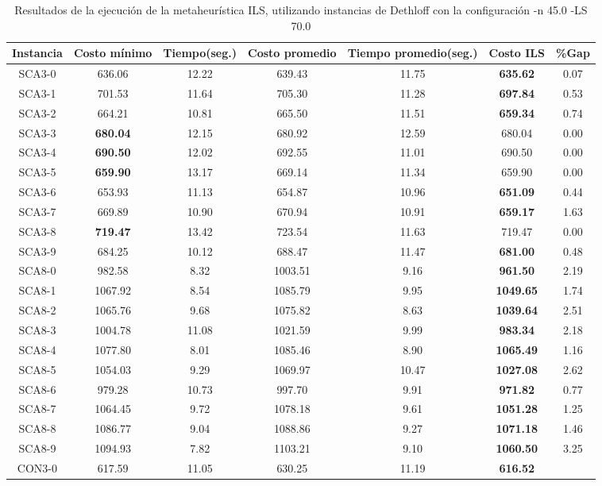 \begin{table}[ht]
\caption{Resultados de la ejecución de la metaheurística ILS, utilizando instancias de Dethloff con la configuración -n 45.0 -LS 70.0}
\centering
\small
\begin{tabular}{c c c c c c c}
\hline\hline
Instancia & Costo mínimo & Tiempo(seg.) & Costo promedio & Tiempo promedio(seg.) & Costo ILS & \%Gap \\ [0.5ex]
\hline
SCA3-0 & 636.06 & 12.22 & 
639.43 & 11.75 & \bf{635.62} & 
0.07\\SCA3-1 & 701.53 & 11.64 & 
705.30 & 11.28 & \bf{697.84} & 
0.53\\SCA3-2 & 664.21 & 10.81 & 
665.50 & 11.51 & \bf{659.34} & 
0.74\\SCA3-3 & \bf{680.04} & 12.15 & 
680.92 & 12.59 & 680.04 & 0.00\\
SCA3-4 & \bf{690.50} & 12.02 & 
692.55 & 11.01 & 690.50 & 0.00\\
SCA3-5 & \bf{659.90} & 13.17 & 
669.14 & 11.34 & 659.90 & 0.00\\
SCA3-6 & 653.93 & 11.13 & 
654.87 & 10.96 & \bf{651.09} & 
0.44\\SCA3-7 & 669.89 & 10.90 & 
670.94 & 10.91 & \bf{659.17} & 
1.63\\SCA3-8 & \bf{719.47} & 13.42 & 
723.54 & 11.63 & 719.47 & 0.00\\
SCA3-9 & 684.25 & 10.12 & 
688.47 & 11.47 & \bf{681.00} & 
0.48\\SCA8-0 & 982.58 & 8.32 & 
1003.51 & 9.16 & \bf{961.50} & 
2.19\\SCA8-1 & 1067.92 & 8.54 & 
1085.79 & 9.95 & \bf{1049.65} & 
1.74\\SCA8-2 & 1065.76 & 9.68 & 
1075.82 & 8.63 & \bf{1039.64} & 
2.51\\SCA8-3 & 1004.78 & 11.08 & 
1021.59 & 9.99 & \bf{983.34} & 
2.18\\SCA8-4 & 1077.80 & 8.01 & 
1085.46 & 8.90 & \bf{1065.49} & 
1.16\\SCA8-5 & 1054.03 & 9.29 & 
1069.97 & 10.47 & \bf{1027.08} & 
2.62\\SCA8-6 & 979.28 & 10.73 & 
997.70 & 9.91 & \bf{971.82} & 
0.77\\SCA8-7 & 1064.45 & 9.72 & 
1078.18 & 9.61 & \bf{1051.28} & 
1.25\\SCA8-8 & 1086.77 & 9.04 & 
1088.86 & 9.27 & \bf{1071.18} & 
1.46\\SCA8-9 & 1094.93 & 7.82 & 
1103.21 & 9.10 & \bf{1060.50} & 
3.25\\CON3-0 & 617.59 & 11.05 & 
630.25 & 11.19 & \bf{616.52} & 

\end{tabular}
\end{table}
